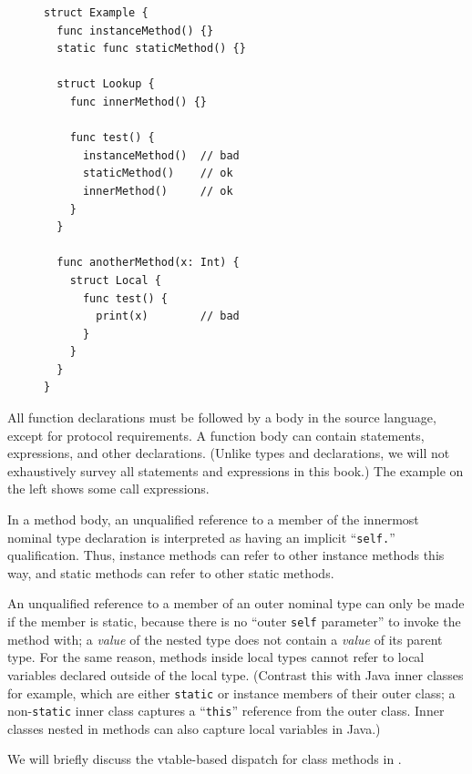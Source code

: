 \documentclass[../generics]{subfiles}
\begin{document}
\begin{figure}
\begin{minipage}{17em}
\begin{Verbatim}
struct Example {
  func instanceMethod() {}
  static func staticMethod() {}

  struct Lookup {
    func innerMethod() {}

    func test() {
      instanceMethod()  // bad
      staticMethod()    // ok
      innerMethod()     // ok
    }
  }

  func anotherMethod(x: Int) {
    struct Local {
      func test() {
        print(x)        // bad
      }
    }
  }
}
\end{Verbatim}
\end{minipage}
\end{figure}

All function declarations must be followed by a body in the source language, except for protocol requirements. A function body can contain statements, expressions, and other declarations. (Unlike types and declarations, we will not exhaustively survey all statements and expressions in this book.) The example on the left shows some call expressions.

In a method body, an unqualified reference to a member of the innermost nominal type declaration is interpreted as having an implicit ``\texttt{self.}'' qualification. Thus, instance methods can refer to other instance methods this way, and static methods can refer to other static methods.

An unqualified reference to a member of an outer nominal type can only be made if the member is static, because there is no ``outer \texttt{self} parameter'' to invoke the method with; a \emph{value} of the nested type does not contain a \emph{value} of its parent type. For the same reason, methods inside local types cannot refer to local variables declared outside of the local type. (Contrast this with Java inner classes for example, which are either \texttt{static} or instance members of their outer class; a non-\texttt{static} inner class captures a ``\texttt{this}'' reference from the outer class. Inner classes nested in methods can also capture local variables in Java.)

We will briefly discuss the vtable-based dispatch for class methods in .
\end{document}
